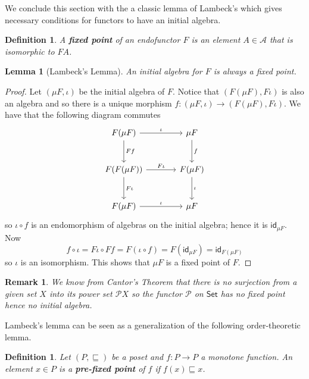 \documentclass[letterpaper, 11pt, oneside]{memoir}
\theoremstyle{myteo}
\newtheorem{lemma}[theorem]{Lemma}
\newtheorem{definition}[theorem]{Definition}
\newtheorem{remark}[theorem]{Remark}
\numberwithin{equation}{section}
\newcommand{\id}{\textsf{id}}
\newcommand{\Set}{\textsf{Set}}
\begin{document}
We conclude this section with the a classic lemma of Lambeck's which gives necessary conditions for functors to have an initial algebra.

\begin{definition}
  A \textbf{fixed point} of an endofunctor \(F\) is an element \(A \in \mathscr{A}\) that is isomorphic to \(FA\).
\end{definition}

\begin{lemma}[Lambeck's Lemma]
  An initial algebra for \(F\) is always a fixed point.
\end{lemma}

\begin{proof}
  Let \((\mu F, \iota)\) be the initial algebra of \(F\).
  Notice that \((F(\mu F), F\iota)\) is also an algebra and so there is a unique morphism \(f \colon (\mu F, \iota) \to (F(\mu F), F\iota)\).
  We have that the following diagram commutes
  \begin{equation*}
    \begin{tikzcd}[sep = large]
      F(\mu F) \ar[r, "\iota"] \ar[d, "Ff"] & \mu F \ar[d, "f"]\\
      F(F(\mu F)) \ar[r, "F\iota"] \ar[d, "F\iota"]& F(\mu F) \ar[d, "\iota"]\\
      F(\mu F) \ar[r, "\iota"] & \mu F
    \end{tikzcd}
  \end{equation*}
  so \(\iota \circ f\) is an endomorphism of algebras on the initial algebra; hence it is \(\id_{\mu F}\).
  Now
  \begin{equation*}
    f \circ \iota = F\iota \circ Ff = F(\iota \circ f) = F(\id_{\mu F}) = \id_{F(\mu F)}
  \end{equation*}
  so \(\iota\) is an isomorphism.
  This shows that \(\mu F\) is a fixed point of \(F\).
\end{proof}

\begin{remark}
  We know from Cantor's Theorem that there is no surjection from a given set \(X\) into its power set \(\mathcal{P}X\) so the functor \(\mathcal{P}\) on \(\Set\) has no fixed point hence no initial algebra.
\end{remark}

Lambeck's lemma can be seen as a generalization of the following order-theoretic lemma.

\begin{definition}
  Let \((P, \sqsubseteq)\) be a poset and \(f \colon P \to P\) a monotone function.
  An element \(x \in P\) is a \textbf{pre-fixed point} of \(f\) if \(f(x) \sqsubseteq x\).
\end{definition}
\end{document}
